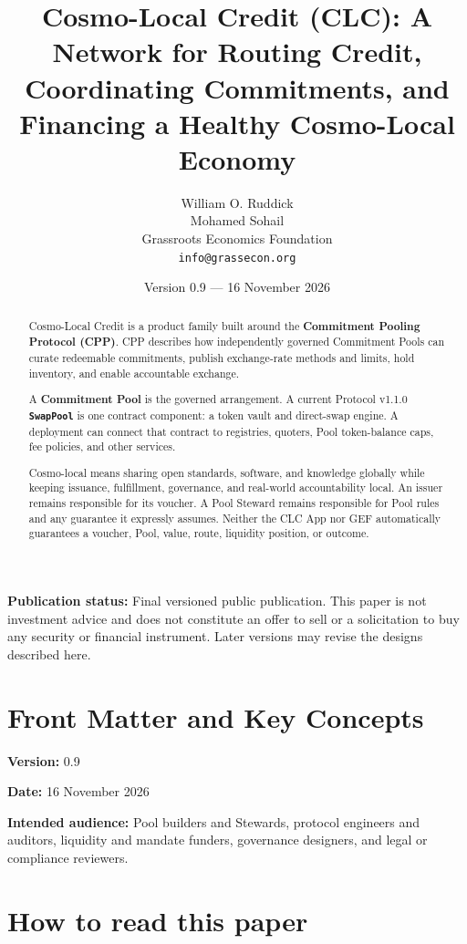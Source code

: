 \documentclass[11pt]{article}
\title{Cosmo-Local Credit (CLC): A Network for Routing Credit, Coordinating Commitments, and Financing a Healthy Cosmo-Local Economy}
\author{William O. Ruddick \\ Mohamed Sohail \\ Grassroots Economics Foundation \\ \texttt{info@grassecon.org}}
\date{Version 0.9 --- 16 November 2026}
\begin{document}
\maketitle

\begin{abstract}
Cosmo-Local Credit is a product family built around the \textbf{Commitment Pooling Protocol (CPP)}. CPP describes how independently governed Commitment Pools can curate redeemable commitments, publish exchange-rate methods and limits, hold inventory, and enable accountable exchange.

A \textbf{Commitment Pool} is the governed arrangement. A current Protocol v1.1.0 \textbf{\texttt{SwapPool}} is one contract component: a token vault and direct-swap engine. A deployment can connect that contract to registries, quoters, Pool token-balance caps, fee policies, and other services.

Cosmo-local means sharing open standards, software, and knowledge globally while keeping issuance, fulfillment, governance, and real-world accountability local. An issuer remains responsible for its voucher. A Pool Steward remains responsible for Pool rules and any guarantee it expressly assumes. Neither the CLC App nor GEF automatically guarantees a voucher, Pool, value, route, liquidity position, or outcome.
\end{abstract}

\noindent\textbf{Publication status:} Final versioned public publication. This paper is not investment advice and does not constitute an offer to sell or a solicitation to buy any security or financial instrument. Later versions may revise the designs described here.

\tableofcontents
\newpage

\section*{Front Matter and Key Concepts}

\textbf{Version:} 0.9

\textbf{Date:} 16 November 2026

\textbf{Intended audience:} Pool builders and Stewards, protocol engineers and auditors, liquidity and mandate funders, governance designers, and legal or compliance reviewers.

\section*{How to read this paper}
\end{document}
